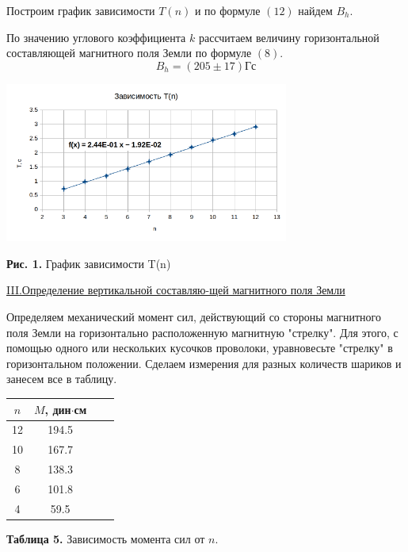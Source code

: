 \documentclass{article}
\begin{document}
Построим график зависимости $T(n)$ и по формуле $(12)$ найдем $B_h$.

По значению углового коэффициента $k$ рассчитаем величину горизонтальной составляющей магнитного поля Земли по формуле $(8)$.
\[
    B_h = (205 \pm 17) \text{Гс}
\]

\newpage

\begin{center}
    \includegraphics[width=0.7\textwidth]{T(n).png}
    
    \textbf{Рис. 1.} График зависимости T(n)
\end{center}

\begin{center}
    \underline{\large {\RN{3}.Определение вертикальной составляю-щей магнитного поля Земли}}
\end{center}

Определяем механический момент сил, действующий со стороны магнитного поля Земли на горизонтально расположенную магнитную "стрелку". Для этого, с помощью одного или нескольких кусочков проволоки, уравновесьте "стрелку" в горизонтальном положении. Сделаем измерения для разных количеств шариков и занесем все в таблицу.

\begin{center}
    \begin{tabular}{|c|c|c|c|}
        \hline
        $n$ & $M$, дин$\cdot$см \\ \hline
        12 & 194.5 \\
        \hline
        10 & 167.7 \\
        \hline
        8 & 138.3 \\
        \hline
        6 & 101.8 \\
        \hline
        4 & 59.5 \\
        \hline
    \end{tabular}
    
    \textbf{Таблица 5.} Зависимость момента сил от $n$.
\end{center}
\end{document}
